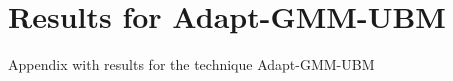 \chapter{Results for Adapt-GMM-UBM}
\label{apx:adapt-gmm-ubm-results}

Appendix with results for the technique Adapt-GMM-UBM